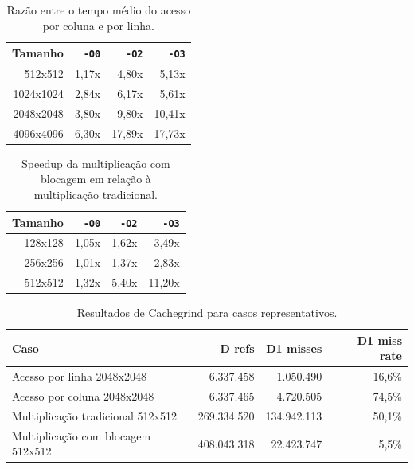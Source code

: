 \begin{table}[ht]
\centering
\caption{Razão entre o tempo médio do acesso por coluna e por linha.}
\label{tab:razao-coluna-linha}
\begin{tabular}{rrrr}
\hline
Tamanho & \texttt{-O0} & \texttt{-O2} & \texttt{-O3} \\
\hline
512x512 & 1,17x & 4,80x & 5,13x \\
1024x1024 & 2,84x & 6,17x & 5,61x \\
2048x2048 & 3,80x & 9,80x & 10,41x \\
4096x4096 & 6,30x & 17,89x & 17,73x \\
\hline
\end{tabular}
\end{table}

\begin{table}[ht]
\centering
\caption{Speedup da multiplicação com blocagem em relação à multiplicação tradicional.}
\label{tab:speedup-blocagem}
\begin{tabular}{rrrr}
\hline
Tamanho & \texttt{-O0} & \texttt{-O2} & \texttt{-O3} \\
\hline
128x128 & 1,05x & 1,62x & 3,49x \\
256x256 & 1,01x & 1,37x & 2,83x \\
512x512 & 1,32x & 5,40x & 11,20x \\
\hline
\end{tabular}
\end{table}

\begin{table}[ht]
\centering
\caption{Resultados de Cachegrind para casos representativos.}
\label{tab:cachegrind}
\begin{tabular}{lrrr}
\hline
Caso & D refs & D1 misses & D1 miss rate \\
\hline
Acesso por linha 2048x2048 & 6.337.458 & 1.050.490 & 16,6\% \\
Acesso por coluna 2048x2048 & 6.337.465 & 4.720.505 & 74,5\% \\
Multiplicação tradicional 512x512 & 269.334.520 & 134.942.113 & 50,1\% \\
Multiplicação com blocagem 512x512 & 408.043.318 & 22.423.747 & 5,5\% \\
\hline
\end{tabular}
\end{table}